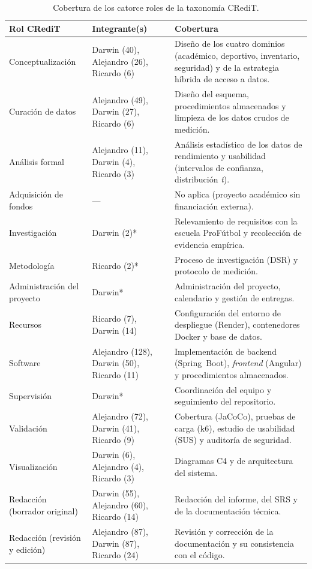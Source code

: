 \documentclass[11pt,a4paper]{article}
\begin{document}
\begin{table}[htbp]
\centering
\scriptsize
\caption{Cobertura de los catorce roles de la taxonomía CRediT.}
\label{tab:credit-cobertura}
\begin{tabular}{@{}p{3.2cm}p{3.4cm}p{7.2cm}@{}}
\toprule
\textbf{Rol CRediT} & \textbf{Integrante(s)} & \textbf{Cobertura} \\
\midrule
Conceptualización & Darwin (40), Alejandro (26), Ricardo (6) & Diseño de los cuatro dominios (académico, deportivo, inventario, seguridad) y de la estrategia híbrida de acceso a datos. \\
Curación de datos & Alejandro (49), Darwin (27), Ricardo (6) & Diseño del esquema, procedimientos almacenados y limpieza de los datos crudos de medición. \\
Análisis formal & Alejandro (11), Darwin (4), Ricardo (3) & Análisis estadístico de los datos de rendimiento y usabilidad (intervalos de confianza, distribución \emph{t}). \\
Adquisición de fondos & --- & No aplica (proyecto académico sin financiación externa). \\
Investigación & Darwin (2)* & Relevamiento de requisitos con la escuela ProFútbol y recolección de evidencia empírica. \\
Metodología & Ricardo (2)* & Proceso de investigación (DSR) y protocolo de medición. \\
Administración del proyecto & Darwin* & Administración del proyecto, calendario y gestión de entregas. \\
Recursos & Ricardo (7), Darwin (14) & Configuración del entorno de despliegue (Render), contenedores Docker y base de datos. \\
Software & Alejandro (128), Darwin (50), Ricardo (11) & Implementación de backend (Spring~Boot), \emph{frontend} (Angular) y procedimientos almacenados. \\
Supervisión & Darwin* & Coordinación del equipo y seguimiento del repositorio. \\
Validación & Alejandro (72), Darwin (41), Ricardo (9) & Cobertura (JaCoCo), pruebas de carga (k6), estudio de usabilidad (SUS) y auditoría de seguridad. \\
Visualización & Darwin (6), Alejandro (4), Ricardo (3) & Diagramas C4 y de arquitectura del sistema. \\
Redacción (borrador original) & Darwin (55), Alejandro (60), Ricardo (14) & Redacción del informe, del SRS y de la documentación técnica. \\
Redacción (revisión y edición) & Alejandro (87), Darwin (87), Ricardo (24) & Revisión y corrección de la documentación y su consistencia con el código. \\
\bottomrule
\end{tabular}
\end{table}
\end{document}
